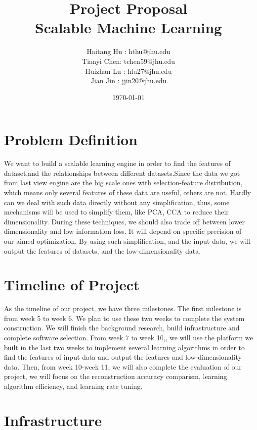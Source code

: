 \documentclass[11pt]{article}
\title{Project Proposal\\Scalable Machine Learning}
\author{Haitang Hu : hthu@jhu.edu\\
Tianyi Chen: tchen59@jhu.edu \\
Huizhan Lu : hlu27@jhu.edu\\
Jian Jin   : jjin20@jhu.edu\\
}
\date{\today}
\begin{document}
\maketitle


\section{Problem Definition}
We want to build a scalable learning engine in order to find the features of dataset,and the relationships between different datasets.Since the data we got from last view engine are the big scale ones with selection-feature distribution, which means only several features of these data are useful, others are not. Hardly can we deal with such data directly without any simplification, thus, some mechanisms will be used to simplify them, like PCA, CCA to reduce their dimensionality. During these techniques, we should also trade off between lower dimensionality and low information loss. It will depend on specific precision of our aimed optimization. By using such simplification, and the input data, we will output the features of datasets, and the low-dimensionality data.

\section{Timeline of Project}
As the timeline of our project, we have three milestones. The first milestone is from week 5 to week 6. We plan to use these two weeks to complete the system construction. We will finish the background research, build infrastructure and complete software selection. From week 7 to week 10,, we will use the platform we built in the last two weeks to implement several learning algorithms in order to find the features of input data and output the features and low-dimensionality data. Then, from week 10-week 11, we will also complete the evaluation of our project, we will focus on the reconstruction accuracy comparism, learning algorithm efficiency, and learning rate tuning.

\section{Infrastructure}
\end{document}
